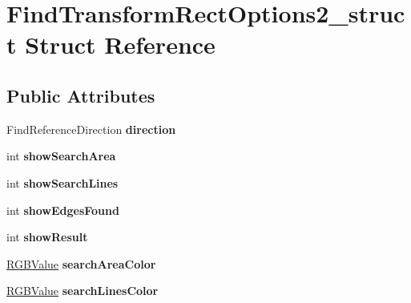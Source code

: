 \hypertarget{structFindTransformRectOptions2__struct}{\section{\-Find\-Transform\-Rect\-Options2\-\_\-struct \-Struct \-Reference}
\label{structFindTransformRectOptions2__struct}
}
\subsection*{\-Public \-Attributes}
\begin{DoxyCompactItemize}
\item 
\hypertarget{structFindTransformRectOptions2__struct_a3e3e4bb9c703b0fcfe1ac9af7f8a1f45}{\-Find\-Reference\-Direction {\bfseries direction}}\label{structFindTransformRectOptions2__struct_a3e3e4bb9c703b0fcfe1ac9af7f8a1f45}

\item 
\hypertarget{structFindTransformRectOptions2__struct_abea00c15d53280992cd2b62cbf9c0345}{int {\bfseries show\-Search\-Area}}\label{structFindTransformRectOptions2__struct_abea00c15d53280992cd2b62cbf9c0345}

\item 
\hypertarget{structFindTransformRectOptions2__struct_a66015c6d70cb3bade582888561e61f8f}{int {\bfseries show\-Search\-Lines}}\label{structFindTransformRectOptions2__struct_a66015c6d70cb3bade582888561e61f8f}

\item 
\hypertarget{structFindTransformRectOptions2__struct_ac9f0f586ecc53a4652ec2509e85f2d8e}{int {\bfseries show\-Edges\-Found}}\label{structFindTransformRectOptions2__struct_ac9f0f586ecc53a4652ec2509e85f2d8e}

\item 
\hypertarget{structFindTransformRectOptions2__struct_ac8303bb79ab62a38ed1900577884c11b}{int {\bfseries show\-Result}}\label{structFindTransformRectOptions2__struct_ac8303bb79ab62a38ed1900577884c11b}

\item 
\hypertarget{structFindTransformRectOptions2__struct_a74b65456477c974efbc45fed5fd11796}{\hyperlink{structRGBValue__struct}{\-R\-G\-B\-Value} {\bfseries search\-Area\-Color}}\label{structFindTransformRectOptions2__struct_a74b65456477c974efbc45fed5fd11796}

\item 
\hypertarget{structFindTransformRectOptions2__struct_acbf10ce746d0670b931eea8ca4ec995a}{\hyperlink{structRGBValue__struct}{\-R\-G\-B\-Value} {\bfseries search\-Lines\-Color}}\label{structFindTransformRectOptions2__struct_acbf10ce746d0670b931eea8ca4ec995a}


\end{DoxyCompactItemize}
